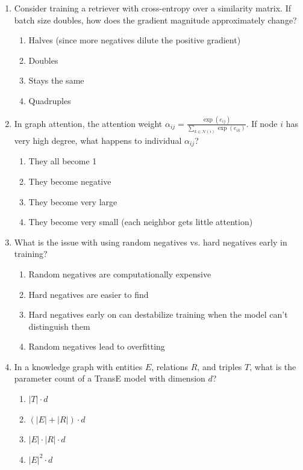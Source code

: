 \documentclass[12pt,a4paper]{article}
\begin{document}
\begin{enumerate}
\item Consider training a retriever with cross-entropy over a similarity matrix. If batch size doubles, how does the gradient magnitude approximately change?
\begin{enumerate}[label=\Alph*)]
    \item Halves (since more negatives dilute the positive gradient)
    \item Doubles
    \item Stays the same
    \item Quadruples
\end{enumerate}

\item In graph attention, the attention weight $\alpha_{ij} = \frac{\exp(e_{ij})}{\sum_{k \in \mathcal{N}(i)} \exp(e_{ik})}$. If node $i$ has very high degree, what happens to individual $\alpha_{ij}$?
\begin{enumerate}[label=\Alph*)]
    \item They all become 1
    \item They become negative
    \item They become very large
    \item They become very small (each neighbor gets little attention)
\end{enumerate}

\item What is the issue with using random negatives vs. hard negatives early in training?
\begin{enumerate}[label=\Alph*)]
    \item Random negatives are computationally expensive
    \item Hard negatives are easier to find
    \item Hard negatives early on can destabilize training when the model can't distinguish them
    \item Random negatives lead to overfitting
\end{enumerate}

\item In a knowledge graph with entities $E$, relations $R$, and triples $T$, what is the parameter count of a TransE model with dimension $d$?
\begin{enumerate}[label=\Alph*)]
    \item $|T| \cdot d$
    \item $(|E| + |R|) \cdot d$
    \item $|E| \cdot |R| \cdot d$
    \item $|E|^2 \cdot d$
\end{enumerate}


\end{enumerate}
\end{document}
